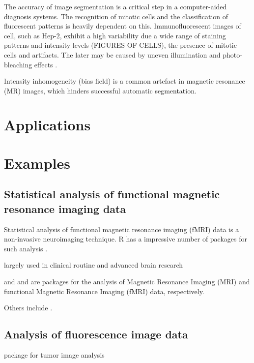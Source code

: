 The accuracy of image segmentation is a critical step in a computer-aided 
diagnosis systems. The recognition of mitotic cells and the classification of 
fluorescent patterns is heavily dependent on this. Immunofluorescent images 
of cell, such as Hep-2, exhibit a high variability due a wide range of staining 
patterns and intensity levels (FIGURES OF CELLS), the presence of mitotic 
cells and  artifacts. The later may be caused by uneven illumination and 
photo-bleaching effects \citep{tonti_automated_2015}.

Intensity inhomogeneity (bias field) is a common artefact in magnetic resonance 
(MR) images, which hinders successful automatic segmentation. \citep{ivanovska_efficient_2016}

\section{Applications}

\section{Examples}
\subsection{Statistical analysis of functional magnetic resonance imaging data}

Statistical analysis of functional magnetic resonance imaging (fMRI) data  is a 
non-invasive neuroimaging technique. R has a impressive number of packages for 
such analysis \citep{tabelow_special_2011}.

largely used in clinical routine and advanced brain research

 \citep{marchini_analyzefmri:_2002, bordier_temporal_2011} and  
\citep{polzehl_fmri:_2007} and are packages for the analysis of Magnetic 
Resonance Imaging (MRI) and functional Magnetic Resonance Imaging (fMRI) data, 
respectively.

 \citep{philipsen_pet:_2010}

Others include  \citep{dunning_beadarray:_2006, frery_introduction_2013}.

\subsection{Analysis of fluorescence image data}

 package \citep{failmezger_crimage:_2012} for tumor image analysis


